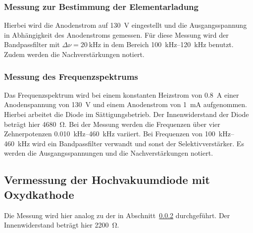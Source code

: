 \subsubsection{Messung zur Bestimmung der Elementarladung}
\label{ssub:messung_zur_bestimmung_der_elementarladung}

Hierbei wird die Anodenstrom auf \SI{130}{\volt} eingestellt und die
Ausgangsspannung in Abhängigkeit des Anodenstroms gemessen.
Für diese Messung wird der Bandpassfilter mit $\Delta\nu = \SI{20}{\kilo\hertz}$
in dem Bereich \SIrange{100}{120}{\kilo\hertz} benutzt. Zudem werden die
Nachverstärkungen notiert.

\subsubsection{Messung des Frequenzspektrums}
\label{ssub:messung_des_frequenzspektrums}

Das Frequenzspektrum wird bei einem konstanten Heizstrom von \SI{0.8}{\ampere}
einer Anodenspannung von \SI{130}{\volt} und einem Anodenstrom von
\SI{1}{\milli\ampere} aufgenommen. Hierbei arbeitet die Diode im
Sättigungsbetrieb.
Der Innenwiderstand der Diode beträgt hier \SI{4680}{\ohm}.
Bei der Messung werden die Frequenzen über vier Zehnerpotenzen
\SIrange{0.010}{460}{\kilo\hertz} variiert. Bei Frequenzen von
\SIrange{100}{460}{\kilo\hertz} wird ein Bandpassfilter verwandt und sonst der
Selektivverstärker. Es werden die Ausgangsspannungen und die Nachverstärkungen
notiert.

\subsection{Vermessung der Hochvakuumdiode mit Oxydkathode}
\label{sub:vermessung_der_hochvakuumdiode_mit_oxydkathode}

Die Messung wird hier analog zu der in
Abschnitt~\ref{ssub:messung_des_frequenzspektrums} durchgeführt.
Der Innenwiderstand beträgt hier \SI{2200}{\ohm}.
